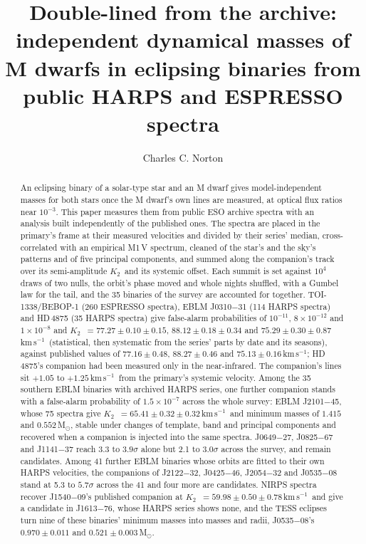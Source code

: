 \documentclass[3p,11pt]{elsarticle}
\newcommand{\kms}{km\,s$^{-1}$}
\newcommand{\Msun}{M$_\odot$}
\newcommand{\Ktwo}{$K_2$}
\begin{document}
\begin{frontmatter}

\title{Double-lined from the archive: independent dynamical masses of M dwarfs in eclipsing binaries from public HARPS and ESPRESSO spectra}

\author{Charles C. Norton}

\begin{abstract}
An eclipsing binary of a solar-type star and an M dwarf gives model-independent masses for both
stars once the M dwarf's own lines are measured, at optical flux ratios near $10^{-3}$. This paper
measures them from public ESO archive spectra with an analysis built independently of the published
ones. The spectra are placed in the primary's frame at their measured velocities and divided by
their series' median, cross-correlated with an empirical M1\,V spectrum, cleaned of the star's and
the sky's patterns and of five principal components, and summed along the companion's track over
its semi-amplitude \Ktwo\ and its systemic offset. Each summit is set against $10^4$ draws of two
nulls, the orbit's phase moved and whole nights shuffled, with a Gumbel law for the tail, and the
35 binaries of the survey are accounted for together. TOI-1338/BEBOP-1 (260 ESPRESSO spectra), EBLM
J0310$-$31 (114 HARPS spectra) and HD\,4875 (35 HARPS spectra) give false-alarm probabilities of
$10^{-11}$, $8\times10^{-12}$ and $1\times10^{-8}$ and \Ktwo\ $= 77.27 \pm 0.10 \pm 0.15$, $88.12
\pm 0.18 \pm 0.34$ and $75.29 \pm 0.30 \pm 0.87$\,\kms\ (statistical, then systematic from the
series' parts by date and its seasons), against published values of $77.16 \pm 0.48$, $88.27 \pm
0.46$ and $75.13 \pm 0.16$\,\kms; HD\,4875's companion had been measured only in the
near-infrared. The companion's lines sit $+1.05$ to $+1.25$\,\kms\ from the primary's systemic
velocity. Among the 35 southern EBLM binaries with archived HARPS series, one further companion
stands with a false-alarm probability of $1.5\times10^{-7}$ across the whole survey: EBLM
J2101$-$45, whose 75 spectra give \Ktwo\ $= 65.41 \pm 0.32 \pm 0.32$\,\kms\ and minimum masses of
$1.415$ and $0.552$\,\Msun, stable under changes of template, band and principal components and
recovered when a companion is injected into the same spectra. J0649$-$27, J0825$-$67 and J1141$-$37
reach 3.3 to $3.9\sigma$ alone but 2.1 to $3.0\sigma$ across the survey, and remain candidates.
Among 41 further EBLM binaries whose orbits are fitted to their own HARPS velocities, the
companions of J2122$-$32, J0425$-$46, J2054$-$32 and J0535$-$08 stand at 5.3 to $5.7\sigma$ across
the 41 and four more are candidates. NIRPS spectra recover J1540$-$09's published companion at
\Ktwo\ $= 59.98 \pm 0.50 \pm 0.78$\,\kms\ and give a candidate in J1613$-$76, whose HARPS series
shows none, and the TESS eclipses turn nine of these binaries' minimum masses into masses and
radii, J0535$-$08's $0.970 \pm 0.011$ and $0.521 \pm 0.003$\,\Msun.
\end{abstract}


\end{frontmatter}
\end{document}
